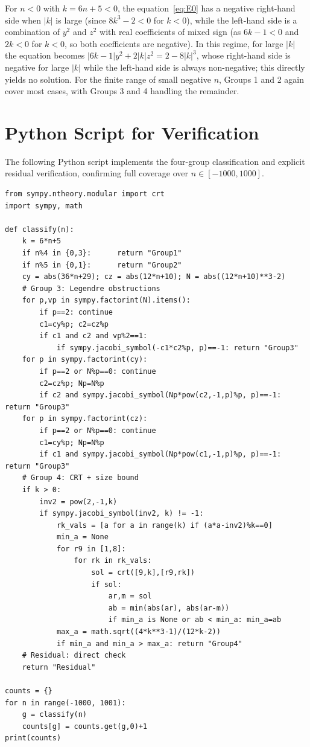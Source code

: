 \documentclass[12pt]{article}
\begin{document}
For $n < 0$ with $k = 6n+5 < 0$, the equation~\eqref{eq:E0} has a negative right-hand side 
when $|k|$ is large (since $8k^3-2 < 0$ for $k < 0$), while the left-hand side 
is a combination of $y^2$ and $z^2$ with real coefficients of mixed sign 
(as $6k-1 < 0$ and $2k < 0$ for $k < 0$, so both coefficients are negative).
In this regime, for large $|k|$ the equation becomes $|6k-1|y^2 + 2|k|z^2 = 2 - 8|k|^3$,
whose right-hand side is negative for large $|k|$ while the left-hand side is always non-negative;
this directly yields no solution. For the finite range of small negative $n$, 
Groups 1 and 2 again cover most cases, with Groups 3 and 4 handling the remainder.

\appendix

\section{Python Script for Verification}\label{app:python}

The following Python script implements the four-group classification and 
explicit residual verification, confirming full coverage over $n \in [-1000, 1000]$.

\begin{verbatim}
from sympy.ntheory.modular import crt
import sympy, math

def classify(n):
    k = 6*n+5
    if n%4 in {0,3}:      return "Group1"
    if n%5 in {0,1}:      return "Group2"
    cy = abs(36*n+29); cz = abs(12*n+10); N = abs((12*n+10)**3-2)
    # Group 3: Legendre obstructions
    for p,vp in sympy.factorint(N).items():
        if p==2: continue
        c1=cy%p; c2=cz%p
        if c1 and c2 and vp%2==1:
            if sympy.jacobi_symbol(-c1*c2%p, p)==-1: return "Group3"
    for p in sympy.factorint(cy):
        if p==2 or N%p==0: continue
        c2=cz%p; Np=N%p
        if c2 and sympy.jacobi_symbol(Np*pow(c2,-1,p)%p, p)==-1: return "Group3"
    for p in sympy.factorint(cz):
        if p==2 or N%p==0: continue
        c1=cy%p; Np=N%p
        if c1 and sympy.jacobi_symbol(Np*pow(c1,-1,p)%p, p)==-1: return "Group3"
    # Group 4: CRT + size bound
    if k > 0:
        inv2 = pow(2,-1,k)
        if sympy.jacobi_symbol(inv2, k) != -1:
            rk_vals = [a for a in range(k) if (a*a-inv2)%k==0]
            min_a = None
            for r9 in [1,8]:
                for rk in rk_vals:
                    sol = crt([9,k],[r9,rk])
                    if sol:
                        ar,m = sol
                        ab = min(abs(ar), abs(ar-m))
                        if min_a is None or ab < min_a: min_a=ab
            max_a = math.sqrt((4*k**3-1)/(12*k-2))
            if min_a and min_a > max_a: return "Group4"
    # Residual: direct check
    return "Residual"

counts = {}
for n in range(-1000, 1001):
    g = classify(n)
    counts[g] = counts.get(g,0)+1
print(counts)
\end{verbatim}
\end{document}
